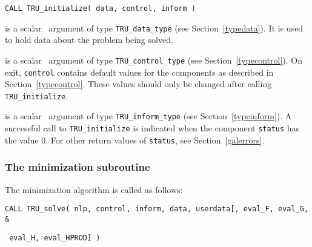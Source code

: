 \documentclass{galahad}
\newcommand{\packagename}{TRU}
\begin{document}
\hspace{8mm}
{\tt CALL \packagename\_initialize( data, control, inform )}

\vspace*{-3mm}
\begin{description}

 is a scalar \intentinout\ argument of type
{\tt \packagename\_data\_type}
(see Section~\ref{typedata}). It is used to hold data about the problem being
solved.

 is a scalar \intentout\ argument of type
{\tt \packagename\_control\_type}
(see Section~\ref{typecontrol}).
On exit, {\tt control} contains default values for the components as
described in Section~\ref{typecontrol}.
These values should only be changed after calling
{\tt \packagename\_initialize}.

 is a scalar \intentout\ argument of type
{\tt \packagename\_inform\_type}
(see Section~\ref{typeinform}). A successful call to
{\tt \packagename\_initialize}
is indicated when the  component {\tt status} has the value 0.
For other return values of {\tt status}, see Section~\ref{galerrors}.

\end{description}


\subsubsection{The minimization subroutine}
The minimization algorithm is called as follows:
\vspace*{1mm}

\hspace{8mm}
{\tt CALL \packagename\_solve( nlp, control, inform, data, userdata[, eval\_F,
eval\_G, \hspace{8mm}                  \&}
\vspace*{-1mm}

\hspace{37mm}
{\tt
eval\_H,  eval\_HPROD] )}
\end{document}
